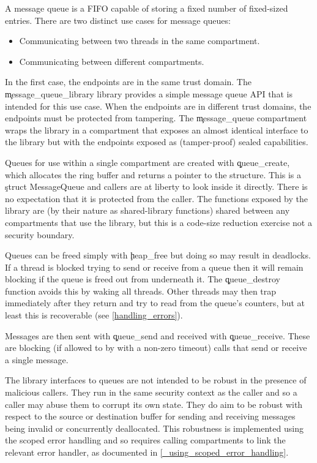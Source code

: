 A message queue is a FIFO capable of storing a fixed number of fixed-sized entries.
There are two distinct use cases for message queues:

\begin{itemize}
	\item{Communicating between two threads in the same compartment.}
	\item{Communicating between different compartments.}
\end{itemize}

In the first case, the endpoints are in the same trust domain.
The \c{message_queue_library} library provides a simple message queue API that is intended for this use case.
When the endpoints are in different trust domains, the endpoints must be protected from tampering.
The \c{message_queue} compartment wraps the library in a compartment that exposes an almost identical interface to the library but with the endpoints exposed as (tamper-proof) sealed capabilities.

Queues for use within a single compartment are created with \c{queue_create}, which allocates the ring buffer and returns a pointer to the structure.
This is a \c{struct MessageQueue} and callers are at liberty to look inside it directly.
There is no expectation that it is protected from the caller.
The functions exposed by the library are (by their nature as shared-library functions) shared between any compartments that use the library, but this is a code-size reduction exercise not a security boundary.


Queues can be freed simply with \c{heap_free} but doing so may result in deadlocks.
If a thread is blocked trying to send or receive from a queue then it will remain blocking if the queue is freed out from underneath it.
The \c{queue_destroy} function avoids this by waking all threads.
Other threads may then trap immediately after they return and try to read from the queue's counters, but at least this is recoverable (see \ref{handling_errors}).


Messages are then sent with \c{queue_send} and received with \c{queue_receive}.
These are blocking (if allowed to by with a non-zero timeout) calls that send or receive a single message.



\begin{caution}
The library interfaces to queues are not intended to be robust in the presence of malicious callers.
They run in the same security context as the caller and so a caller may abuse them to corrupt its own state.
They do aim to be robust with respect to the source or destination buffer for sending and receiving messages being invalid or concurrently deallocated.
This robustness is implemented using the scoped error handling and so requires calling compartments to link the relevant error handler, as documented in \ref{_using_scoped_error_handling}.
\end{caution}

